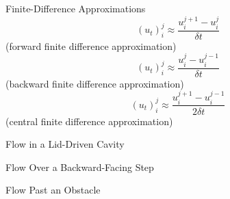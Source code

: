 \documentclass[frames]{prosper}
\begin{document}
\begin{slide}[Dissolve]{Finite-Difference Approximations}
$$ (u_{t})_{i}^{j} \approx \frac{u_{i}^{j+1} - u_{i}^{j}}{\delta t} $$ (forward finite difference approximation)
$$ (u_{t})_{i}^{j} \approx \frac{u_{i}^{j} - u_{i}^{j-1}}{\delta t} $$ (backward finite difference approximation)
$$ (u_{t})_{i}^{j} \approx \frac{u_{i}^{j+1} - u_{i}^{j-1}}{2\delta t} $$ (central finite difference approximation)
\end{slide}

\begin{slide}[Dissolve]{Flow in a Lid-Driven Cavity}

\end{slide}

\begin{slide}[Dissolve]{Flow Over a Backward-Facing Step}

\end{slide}

\begin{slide}[Dissolve]{Flow Past an Obstacle}

\end{slide}
\end{document}
